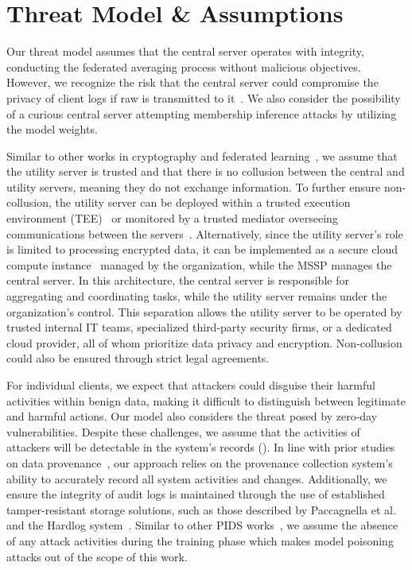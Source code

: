 
\section{Threat Model \& Assumptions}

Our threat model assumes that the central server operates with integrity, conducting the federated averaging process without malicious objectives. However, we recognize the risk that the central server could compromise the privacy of client logs if raw \logs is transmitted to it~\cite{man2021intelligent,li2023efficient}. We also consider the possibility of a curious central server attempting membership inference attacks by utilizing the model weights.

Similar to other works in cryptography and federated learning~\cite{roy2020crypte,wu2022federated}, we assume that the utility server is trusted and that there is no collusion between the central and utility servers, meaning they do not exchange information. To further ensure non-collusion, the utility server can be deployed within a trusted execution environment (TEE)~\cite{mckeen2016intel} or monitored by a trusted mediator overseeing communications between the servers~\cite{alwen2009collusion}. Alternatively, since the utility server's role is limited to processing encrypted data, it can be implemented as a secure cloud compute instance~\cite{cloudinstance} managed by the organization, while the MSSP manages the central server. In this architecture, the central server is responsible for aggregating and coordinating tasks, while the utility server remains under the organization's control. This separation allows the utility server to be operated by trusted internal IT teams, specialized third-party security firms, or a dedicated cloud provider, all of whom prioritize data privacy and encryption. Non-collusion could also be ensured through strict legal agreements.

For individual clients, we expect that attackers could disguise their harmful activities within benign data, making it difficult to distinguish between legitimate and harmful actions. Our model also considers the threat posed by zero-day vulnerabilities. Despite these challenges, we assume that the activities of attackers will be detectable in the system's records (\logs). In line with prior studies on data provenance~\cite{nodoze2019, priotracker2018, mzx2016, bates2017transparent, omegalog, rapsheet2020, provthings2018, dossier, inam2023sok, poirot2019, kwon18mci, winnower2018, lzx2013, ma2015accurate, ma2018kernel, mpi}, our approach relies on the provenance collection system's ability to accurately record all system activities and changes. Additionally, we ensure the integrity of audit logs is maintained through the use of established tamper-resistant storage solutions, such as those described by Paccagnella et al.~\cite{paccagnella2020custos} and the Hardlog system~\cite{hardlog}. Similar to other PIDS works~\cite{cheng2023kairos, flash2024, yangprographer, wang2022threatrace, provdetector2020}, we assume the absence of any attack activities during the training phase which makes model poisoning attacks out of the scope of this work.


